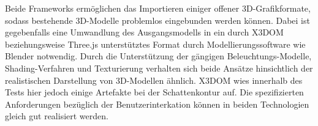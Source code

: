 Beide Frameworks ermöglichen das Importieren einiger offener 3D-Grafikformate, sodass bestehende 3D-Modelle problemlos eingebunden werden können. Dabei ist gegebenfalls eine Umwandlung des Ausgangsmodells in ein durch X3DOM beziehungsweise Three.js unterstütztes Format durch Modellierungssoftware wie Blender \autocite{SOFTWARE_BLENDER} notwendig. Durch die Unterstützung der gängigen Beleuchtungs-Modelle, Shading-Verfahren und Texturierung verhalten sich beide Ansätze hinsichtlich der realistischen Darstellung von 3D-Modellen ähnlich. X3DOM wies innerhalb des Tests hier jedoch einige Artefakte bei der Schattenkontur auf. Die spezifizierten Anforderungen bezüglich der Benutzerinterkation können in beiden Technologien gleich gut realisiert werden.
